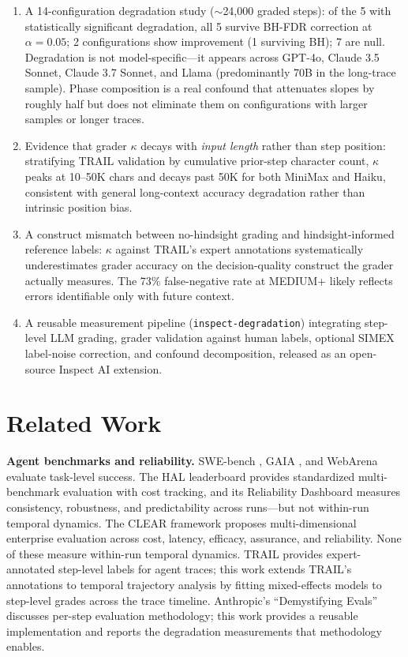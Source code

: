 \documentclass[11pt]{article}
\begin{document}
\begin{enumerate}
    \item A 14-configuration degradation study (${\sim}$24,000 graded steps): of the 5 with statistically significant degradation, all 5 survive BH-FDR correction at $\alpha=0.05$; 2 configurations show improvement (1 surviving BH); 7 are null. Degradation is not model-specific---it appears across GPT-4o, Claude 3.5 Sonnet, Claude 3.7 Sonnet, and Llama (predominantly 70B in the long-trace sample). Phase composition is a real confound that attenuates slopes by roughly half but does not eliminate them on configurations with larger samples or longer traces.
    \item Evidence that grader $\kappa$ decays with \emph{input length} rather than step position: stratifying TRAIL validation by cumulative prior-step character count, $\kappa$ peaks at 10--50K chars and decays past 50K for both MiniMax and Haiku, consistent with general long-context accuracy degradation rather than intrinsic position bias.
    \item A construct mismatch between no-hindsight grading and hindsight-informed reference labels: $\kappa$ against TRAIL's expert annotations systematically underestimates grader accuracy on the decision-quality construct the grader actually measures. The 73\% false-negative rate at MEDIUM+ likely reflects errors identifiable only with future context.
    \item A reusable measurement pipeline (\texttt{inspect-degradation}) integrating step-level LLM grading, grader validation against human labels, optional SIMEX label-noise correction, and confound decomposition, released as an open-source Inspect AI extension.
\end{enumerate}

\section{Related Work}

\textbf{Agent benchmarks and reliability.}
SWE-bench \citep{jimenez2024swebench}, GAIA \citep{mialon2023gaia}, and WebArena \citep{zhou2024webarena} evaluate task-level success.
The HAL leaderboard \citep{kapoor2026hal} provides standardized multi-benchmark evaluation with cost tracking, and its Reliability Dashboard measures consistency, robustness, and predictability across runs---but not within-run temporal dynamics.
The CLEAR framework \citep{mehta2025clear} proposes multi-dimensional enterprise evaluation across cost, latency, efficacy, assurance, and reliability.
None of these measure within-run temporal dynamics.
TRAIL \citep{patronus2024trail} provides expert-annotated step-level labels for agent traces; this work extends TRAIL's annotations to temporal trajectory analysis by fitting mixed-effects models to step-level grades across the trace timeline.
Anthropic's ``Demystifying Evals'' \citep{anthropic2025evals} discusses per-step evaluation methodology; this work provides a reusable implementation and reports the degradation measurements that methodology enables.
\end{document}
